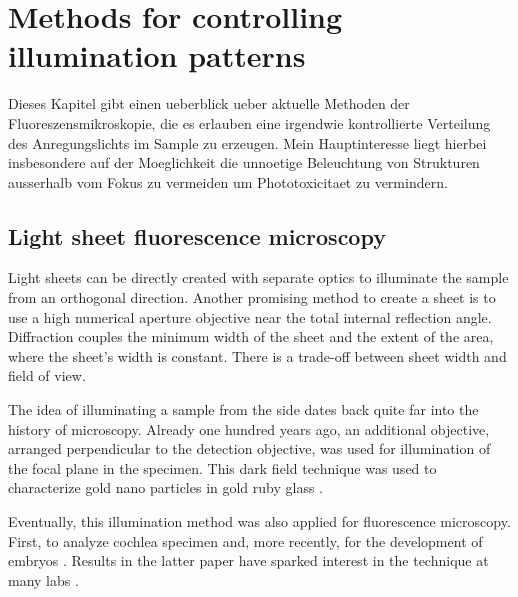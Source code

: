 
\chapter{Methods for controlling illumination patterns}
\label{sec:approaches}
%
\begin{summary}
  Dieses Kapitel gibt einen ueberblick ueber aktuelle Methoden der
  Fluoreszensmikroskopie, die es erlauben eine irgendwie kontrollierte
  Verteilung des Anregungslichts im Sample zu erzeugen. Mein
  Hauptinteresse liegt hierbei insbesondere auf der Moeglichkeit die
  unnoetige Beleuchtung von Strukturen ausserhalb vom Fokus zu
  vermeiden um Phototoxicitaet zu vermindern.
\end{summary}
\section{Light sheet fluorescence microscopy}
\label{sec:light-sheet-microscopy}
\begin{summary}
  Light sheets can be directly created with separate optics to
  illuminate the sample from an orthogonal direction. Another
  promising method to create a sheet is to use a high numerical
  aperture objective near the total internal reflection
  angle. Diffraction couples the minimum width of the sheet and the
  extent of the area, where the sheet's width is constant. There is a
  trade-off between sheet width and field of view.
\end{summary}
The idea of illuminating a sample from the side dates back quite far
into the history of microscopy. Already one hundred years ago, an
additional objective, arranged perpendicular to the detection
objective, was used for illumination of the focal plane in the
specimen. This dark field technique was used to characterize gold nano
particles in gold ruby glass \citep{Siedentopf1903}.

Eventually, this illumination method was also applied for fluorescence
microscopy. First, to analyze cochlea specimen \citep{Voie1993} and,
more recently, for the development of embryos
\citep{Huisken2004}. Results in the latter paper have sparked interest
in the technique at many labs \citep{Santi2011}.
